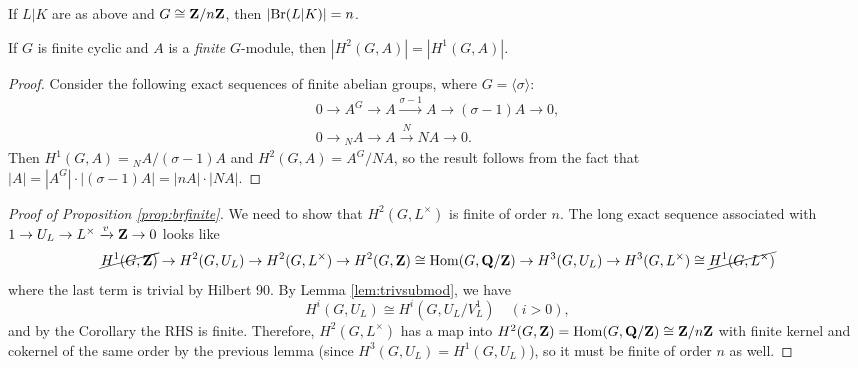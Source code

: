 \documentclass{article}
\begin{document}
\begin{prop}\label{prop:brfinite}
		If $L|K$ are as above and $G\cong \mathbf{Z}/n\mathbf{Z}$, then $|\text{Br}(L|K)| = n$.
\end{prop}
\begin{lem}
		If $G$ is finite cyclic and $A$ is a \emph{finite} $G$-module, then $|H^2(G,A)| = |H^1(G,A)|$.
\end{lem}
\begin{proof}
		Consider the following exact sequences of finite abelian groups, where $G=\langle \sigma\rangle$:
		\begin{gather*}
				0 \to A^G \to A \xrightarrow{\sigma-1} A \to (\sigma-1)A \to 0,\\
				0 \to {_NA} \to A \xrightarrow{N}NA\to 0.
		\end{gather*}
		Then $H^1(G,A) = {_NA}/(\sigma-1)A$ and $H^2(G,A) = A^G/NA$, so the result follows from the fact that $|A| = |A^G|\cdot |(\sigma-1)A| = |nA|\cdot |NA|$.
\end{proof}
\begin{proof}[Proof of Proposition \ref{prop:brfinite}]
		We need to show that $H^2(G,L^\times)$ is finite of order $n$. The long exact sequence associated with $1\to U_L \to L^\times \xrightarrow{v} \mathbf{Z} \to 0$ looks like
		\[
			\cancel{H^1(G,\mathbf{Z})} \to H^2(G,U_L) \to H^2(G,L^\times) \to H^2(G,\mathbf{Z}) \cong \operatorname{Hom}(G,\mathbf{Q}/\mathbf{Z}) \to H^3(G,U_L) \to H^3(G,L^\times)\cong \cancel{H^1(G,L^\times)}
		\]
		where the last term is trivial by Hilbert 90. By Lemma \ref{lem:trivsubmod}, we have
		\[
			H^i(G,U_L) \cong H^i(G,U_L/V_L^1) \quad (i>0),	
		\]
		and by the Corollary the RHS is finite. Therefore, $H^2(G,L^\times)$ has a map into $H^2(G,\mathbf{Z})=\operatorname{Hom}(G,\mathbf{Q}/\mathbf{Z})\cong \mathbf{Z}/n\mathbf{Z}$ with finite kernel and cokernel of the same order by the previous lemma (since $H^3(G,U_L)=H^1(G,U_L)$), so it must be finite of order $n$ as well.
\end{proof}
\end{document}
